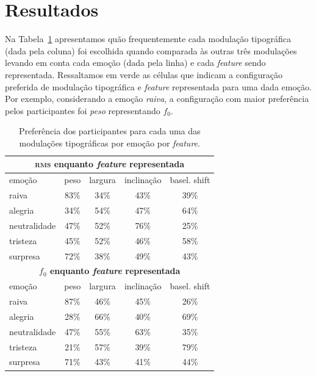\documentclass[11pt]{article}
\begin{document}
\section{Resultados}
  \label{sec:resultados}
  
  Na Tabela~\ref{tab:type_perf} apresentamos quão frequentemente cada modulação tipográfica (dada pela coluna) foi escolhida quando comparada às outras três modulações levando em conta cada emoção (dada pela linha) e cada {\itshape feature} sendo representada. Ressaltamos em verde as células que indicam a configuração preferida de modulação tipográfica e {\itshape feature} representada para uma dada emoção. Por exemplo, considerando a emoção {\itshape raiva}, a configuração com maior preferência pelos participantes foi {\itshape peso} representando $f_0$.
  
\begin{table}
    \begin{tabular*}{\linewidth}{lcccc}
        \toprule
        \multicolumn{5}{c}{ \textbf{\textsc{rms} enquanto {\itshape feature} representada} }     \\
        \midrule
        \small{emoção} & \small{peso} & \small{largura} & \small{inclinação} & \small{basel. shift}  \\
        \midrule
        raiva           & 83\% & 34\% & 43\% & 39\% \\
        alegria         & 34\% & 54\% & 47\% & 64\% \\
        neutralidade    & 47\% & 52\% & \cellcolor[HTML]{9ef7cd}76\% & 25\% \\
        tristeza        & 45\% & 52\% & 46\% & 58\% \\
        surpresa        & \cellcolor[HTML]{9ef7cd}72\% & 38\% & 49\% & 43\% \\
        \midrule
        \multicolumn{5}{c}{ \textbf{$f_0$ enquanto {\itshape feature} representada} }      \\
        \midrule
        \small{emoção} & \small{peso} & \small{largura} & \small{inclinação} & \small{basel. shift}  \\
        \midrule
        raiva           & \cellcolor[HTML]{9ef7cd}87\% & 46\% & 45\% & 26\% \\
        alegria         & 28\% & 66\% & 40\% & \cellcolor[HTML]{9ef7cd}69\% \\
        neutralidade    & 47\% & 55\% & 63\% & 35\% \\
        tristeza        & 21\% & 57\% & 39\% & \cellcolor[HTML]{9ef7cd}79\% \\
        surpresa        & 71\% & 43\% & 41\% & 44\% \\
        \bottomrule
    \end{tabular*}
    \caption{Preferência dos participantes para cada uma das modulações tipográficas por emoção por {\itshape feature}. }
    \label{tab:type_perf}
\end{table}
  
\end{document}
